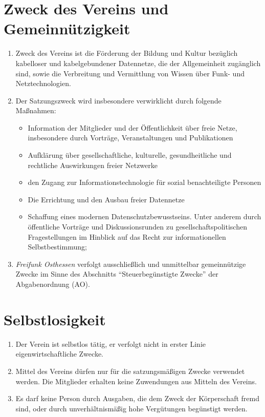 \documentclass[ngerman]{article}
\begin{document}
\section{Zweck des Vereins und Gemeinnützigkeit}
\begin{enumerate}
\item Zweck des Vereins ist die Förderung der Bildung und Kultur bezüglich kabelloser und kabelgebundener Datennetze, die der Allgemeinheit zugänglich sind, sowie die Verbreitung und Vermittlung von Wissen über Funk- und Netztechnologien.
\item Der Satzungszweck wird insbesondere verwirklicht durch folgende Maßnahmen:
\begin{itemize}
  \item Information der Mitglieder und der Öffentlichkeit über freie Netze, insbesondere durch Vorträge, Veranstaltungen und Publikationen
  \item Aufklärung über gesellschaftliche, kulturelle, gesundheitliche und rechtliche Auswirkungen freier Netzwerke
  \item den Zugang zur Informationstechnologie für sozial benachteiligte Personen
  \item Die Errichtung und den Ausbau freier Datennetze
  \item Schaffung eines modernen Datenschutzbewusstseins.
  Unter anderem durch öffentliche Vorträge und Diskussionsrunden zu gesellschaftspolitischen Fragestellungen im Hinblick auf das Recht zur informationellen Selbstbestimmung;
\end{itemize}

\item \emph{Freifunk Osthessen} verfolgt ausschließlich und unmittelbar gemeinnützige Zwecke im Sinne des Abschnitts ``Steuerbegünstigte Zwecke'' der Abgabenordnung (AO).
\end{enumerate}

\section{Selbstlosigkeit}
\begin{enumerate}
  \item Der Verein ist selbstlos tätig, er verfolgt nicht in erster Linie eigenwirtschaftliche Zwecke.
  \item Mittel des Vereins dürfen nur für die satzungsmäßigen Zwecke verwendet werden.
  Die Mitglieder erhalten keine Zuwendungen aus Mitteln des Vereins.
  \item Es darf keine Person durch Ausgaben, die dem Zweck der Körperschaft fremd sind, oder durch unverhältnismäßig hohe Vergütungen begünstigt werden.
\end{enumerate}
\end{document}

